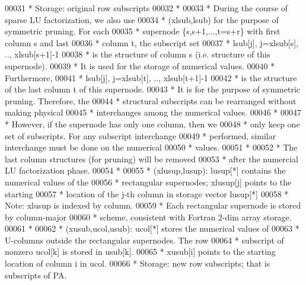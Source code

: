 \begin{DoxyCode}
00031 \textcolor{comment}{ *  Storage: original row subscripts}
00032 \textcolor{comment}{ *}
00033 \textcolor{comment}{ *      During the course of sparse LU factorization, we also use}
00034 \textcolor{comment}{ *  (xlsub,lsub) for the purpose of symmetric pruning. For each}
00035 \textcolor{comment}{ *  supernode \{s,s+1,...,t=s+r\} with first column s and last}
00036 \textcolor{comment}{ *  column t, the subscript set}
00037 \textcolor{comment}{ *    lsub[j], j=xlsub[s], .., xlsub[s+1]-1}
00038 \textcolor{comment}{ *  is the structure of column s (i.e. structure of this supernode).}
00039 \textcolor{comment}{ *  It is used for the storage of numerical values.}
00040 \textcolor{comment}{ *  Furthermore,}
00041 \textcolor{comment}{ *    lsub[j], j=xlsub[t], .., xlsub[t+1]-1}
00042 \textcolor{comment}{ *  is the structure of the last column t of this supernode.}
00043 \textcolor{comment}{ *  It is for the purpose of symmetric pruning. Therefore, the}
00044 \textcolor{comment}{ *  structural subscripts can be rearranged without making physical}
00045 \textcolor{comment}{ *  interchanges among the numerical values.}
00046 \textcolor{comment}{ *}
00047 \textcolor{comment}{ *  However, if the supernode has only one column, then we}
00048 \textcolor{comment}{ *  only keep one set of subscripts. For any subscript interchange}
00049 \textcolor{comment}{ *  performed, similar interchange must be done on the numerical}
00050 \textcolor{comment}{ *  values.}
00051 \textcolor{comment}{ *}
00052 \textcolor{comment}{ *  The last column structures (for pruning) will be removed}
00053 \textcolor{comment}{ *  after the numercial LU factorization phase.}
00054 \textcolor{comment}{ *}
00055 \textcolor{comment}{ *   (xlusup,lusup): lusup[*] contains the numerical values of the}
00056 \textcolor{comment}{ *  rectangular supernodes; xlusup[j] points to the starting}
00057 \textcolor{comment}{ *  location of the j-th column in storage vector lusup[*]}
00058 \textcolor{comment}{ *  Note: xlusup is indexed by column.}
00059 \textcolor{comment}{ *  Each rectangular supernode is stored by column-major}
00060 \textcolor{comment}{ *  scheme, consistent with Fortran 2-dim array storage.}
00061 \textcolor{comment}{ *}
00062 \textcolor{comment}{ *   (xusub,ucol,usub): ucol[*] stores the numerical values of}
00063 \textcolor{comment}{ *  U-columns outside the rectangular supernodes. The row}
00064 \textcolor{comment}{ *  subscript of nonzero ucol[k] is stored in usub[k].}
00065 \textcolor{comment}{ *  xusub[i] points to the starting location of column i in ucol.}
00066 \textcolor{comment}{ *  Storage: new row subscripts; that is subscripts of PA.}

\end{DoxyCode}
